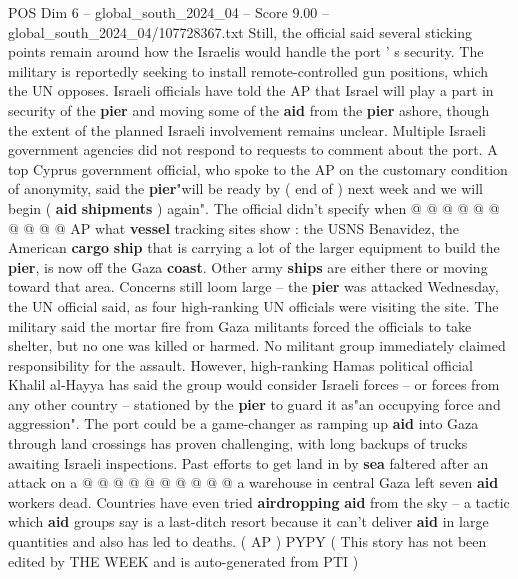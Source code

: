 \begin{textsample}{POS Dim 6 – global\_south\_2024\_04 – Score 9.00 – global\_south\_2024\_04/107728367.txt}
Still, the official said several sticking points remain around how the Israelis would handle the port ' s security.
The military is reportedly seeking to install remote-controlled gun positions, which the UN opposes.
Israeli officials have told the AP that Israel will play a part in security of the \textbf{pier} and moving some of the \textbf{aid} from the \textbf{pier} ashore, though the extent of the planned Israeli involvement remains unclear.
Multiple Israeli government agencies did not respond to requests to comment about the port.
A top Cyprus government official, who spoke to the AP on the customary condition of anonymity, said the \textbf{pier}"will be ready by ( end of ) next week and we will begin ( \textbf{aid} \textbf{shipments} ) again".
The official didn't specify when @ @ @ @ @ @ @ @ @ @ AP what \textbf{vessel} tracking sites show : the USNS Benavidez, the American \textbf{cargo} \textbf{ship} that is carrying a lot of the larger equipment to build the \textbf{pier}, is now off the Gaza \textbf{coast}.
Other army \textbf{ships} are either there or moving toward that area.
Concerns still loom large -- the \textbf{pier} was attacked Wednesday, the UN official said, as four high-ranking UN officials were visiting the site.
The military said the mortar fire from Gaza militants forced the officials to take shelter, but no one was killed or harmed.
No militant group immediately claimed responsibility for the assault.
However, high-ranking Hamas political official Khalil al-Hayya has said the group would consider Israeli forces -- or forces from any other country -- stationed by the \textbf{pier} to guard it as"an occupying force and aggression".
The port could be a game-changer as ramping up \textbf{aid} into Gaza through land crossings has proven challenging, with long backups of trucks awaiting Israeli inspections.
Past efforts to get land in by \textbf{sea} faltered after an attack on a @ @ @ @ @ @ @ @ @ @ a warehouse in central Gaza left seven \textbf{aid} workers dead.
Countries have even tried \textbf{airdropping} \textbf{aid} from the sky -- a tactic which \textbf{aid} groups say is a last-ditch resort because it can't deliver \textbf{aid} in large quantities and also has led to deaths. ( AP ) PYPY ( This story has not been edited by THE WEEK and is auto-generated from PTI )

\end{textsample}
